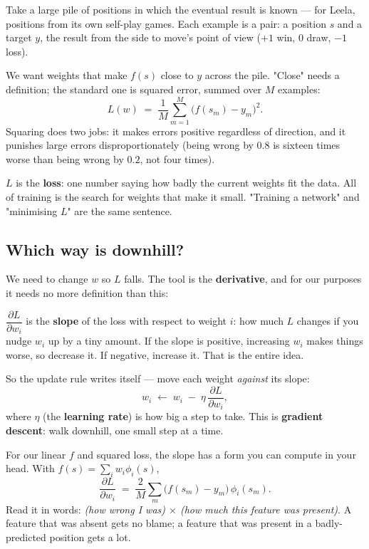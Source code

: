 Take a large pile of positions in which the eventual result is known --- for Leela, positions
from its own self-play games. Each example is a pair: a position $s$ and a target $y$, the
result from the side to move's point of view ($+1$ win, $0$ draw, $-1$ loss).

We want weights that make $f(s)$ close to $y$ across the pile. "Close" needs a definition;
the standard one is squared error, summed over $M$ examples:
\begin{equation}
  \label{eq:mse}
  L(w) \;=\; \frac{1}{M}\sum_{m=1}^{M}\bigl(f(s_m) - y_m\bigr)^2 .
\end{equation}
Squaring does two jobs: it makes errors positive regardless of direction, and it punishes
large errors disproportionately (being wrong by $0.8$ is sixteen times worse than being wrong
by $0.2$, not four times).

\begin{notationbox}
$L$ is the \textbf{loss}: one number saying how badly the current weights fit the data. All
of training is the search for weights that make it small. "Training a network" and
"minimising $L$" are the same sentence.
\end{notationbox}

\subsection{Which way is downhill?}

We need to change $w$ so $L$ falls. The tool is the \textbf{derivative}, and for our purposes
it needs no more definition than this:

\begin{keyidea}
$\dfrac{\partial L}{\partial w_i}$ is the \textbf{slope} of the loss with respect to weight
$i$: how much $L$ changes if you nudge $w_i$ up by a tiny amount. If the slope is positive,
increasing $w_i$ makes things worse, so decrease it. If negative, increase it. That is the
entire idea.
\end{keyidea}

So the update rule writes itself --- move each weight \emph{against} its slope:
\begin{equation}
  \label{eq:gd}
  w_i \;\leftarrow\; w_i \;-\; \eta\,\frac{\partial L}{\partial w_i},
\end{equation}
where $\eta$ (the \textbf{learning rate}) is how big a step to take. This is
\textbf{gradient descent}: walk downhill, one small step at a time.

For our linear $f$ and squared loss, the slope has a form you can compute in your head. With
$f(s) = \sum_i w_i \phi_i(s)$,
\[
  \frac{\partial L}{\partial w_i}
  \;=\; \frac{2}{M}\sum_{m}\bigl(f(s_m) - y_m\bigr)\,\phi_i(s_m) .
\]
Read it in words: \emph{(how wrong I was) $\times$ (how much this feature was present)}. A
feature that was absent gets no blame; a feature that was present in a badly-predicted
position gets a lot.

